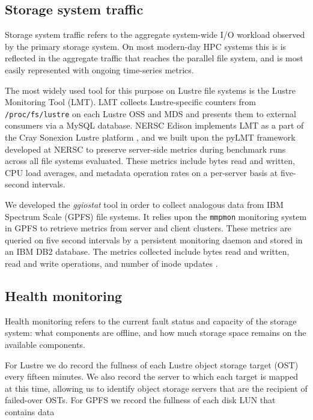 \subsection{Storage system traffic}

Storage system traffic refers to the aggregate system-wide I/O workload
observed by the primary storage system.  On most modern-day HPC systems this
is is reflected in the aggregate traffic that reaches the parallel file
system, and is most easily represented with ongoing time-series metrics.

\label{sec:methods/lmt}
The most widely used tool for this purpose on Lustre file systems is the Lustre
Monitoring Tool (LMT).  LMT collects Lustre-specific
counters from \texttt{/proc/fs/lustre} on each Lustre OSS and MDS and presents
them to external consumers via a MySQL database.  NERSC Edison implements LMT
as a part of the Cray Sonexion Lustre platform \cite{Keopp2014}, and we built
upon the pyLMT framework developed at NERSC \cite{Uselton2009} to preserve
server-side metrics during benchmark runs across all file systems evaluated.
These metrics include bytes read and written, CPU load averages, and metadata
operation rates on a per-server basis at five-second intervals.

\label{sec:methods/ggiostat}
We developed the \emph{ggiostat} tool in order to collect analogous data from
IBM Spectrum Scale (GPFS) file systems.    It relies upon the
\texttt{mmpmon} monitoring system in GPFS to retrieve metrics from server and
client clusters.  These metrics are queried on five second intervals by a
persistent monitoring daemon and stored in an IBM DB2 database.
The metrics collected include bytes read and written,
read and write operations, and number of inode updates .

\subsection{Health monitoring }
\label{sec:methods/health}

Health monitoring refers to the current fault status and capacity of the
storage system: what components are offline, and how much storage space
remains on the available components.

For Lustre we do record the fullness of each Lustre object storage target (OST) every fifteen minutes.  We also record the server to which each target is mapped at this time, allowing us to identify object storage servers that are the recipient of failed-over OSTs.  For GPFS we record the fullness of each disk LUN that contains data

